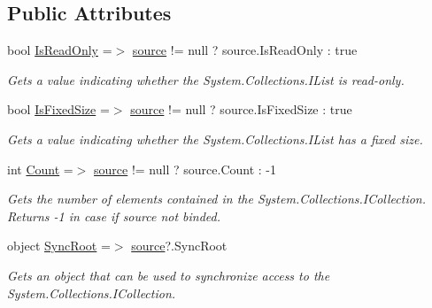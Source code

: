 \subsection*{Public Attributes}
\begin{DoxyCompactItemize}
\item 
bool \mbox{\hyperlink{class_wpf_handler_1_1_u_i_1_1_controls_1_1_collection_control_a2e1f163821f2cbc367ef40d3dcf652eb}{Is\+Read\+Only}} =$>$ \mbox{\hyperlink{class_wpf_handler_1_1_u_i_1_1_controls_1_1_collection_control_a78ccfdc5208ab2306308d7356757f32f}{source}} != null ? source.\+Is\+Read\+Only \+: true
\begin{DoxyCompactList}\small\item\em Gets a value indicating whether the System.\+Collections.\+I\+List is read-\/only. \end{DoxyCompactList}\item 
bool \mbox{\hyperlink{class_wpf_handler_1_1_u_i_1_1_controls_1_1_collection_control_aa95fcae30ed2356bfff8154bcceecc8a}{Is\+Fixed\+Size}} =$>$ \mbox{\hyperlink{class_wpf_handler_1_1_u_i_1_1_controls_1_1_collection_control_a78ccfdc5208ab2306308d7356757f32f}{source}} != null ? source.\+Is\+Fixed\+Size \+: true
\begin{DoxyCompactList}\small\item\em Gets a value indicating whether the System.\+Collections.\+I\+List has a fixed size. \end{DoxyCompactList}\item 
int \mbox{\hyperlink{class_wpf_handler_1_1_u_i_1_1_controls_1_1_collection_control_af4796b6959bcb870bde22f6d32379242}{Count}} =$>$ \mbox{\hyperlink{class_wpf_handler_1_1_u_i_1_1_controls_1_1_collection_control_a78ccfdc5208ab2306308d7356757f32f}{source}} != null ? source.\+Count \+: -\/1
\begin{DoxyCompactList}\small\item\em Gets the number of elements contained in the System.\+Collections.\+I\+Collection. Returns -\/1 in case if source not binded. \end{DoxyCompactList}\item 
object \mbox{\hyperlink{class_wpf_handler_1_1_u_i_1_1_controls_1_1_collection_control_a4ab9c597654cf0ca762f2fa13e807fc7}{Sync\+Root}} =$>$ \mbox{\hyperlink{class_wpf_handler_1_1_u_i_1_1_controls_1_1_collection_control_a78ccfdc5208ab2306308d7356757f32f}{source}}?.Sync\+Root
\begin{DoxyCompactList}\small\item\em Gets an object that can be used to synchronize access to the System.\+Collections.\+I\+Collection. \end{DoxyCompactList}\item 

\end{DoxyCompactItemize}
